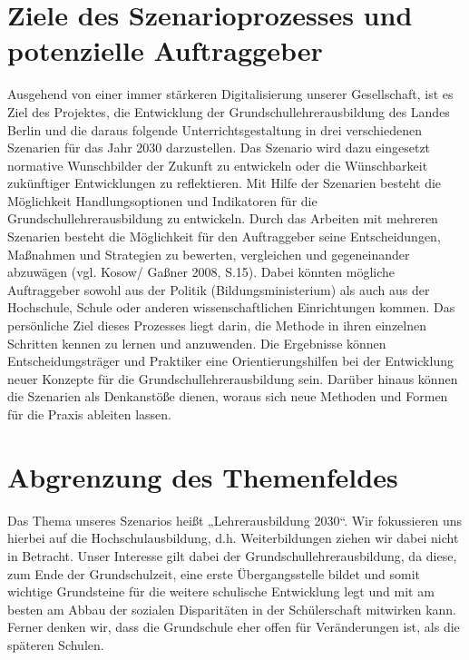 \documentclass[12pt,a4paper]{article}
\begin{document}
\section{Ziele des Szenarioprozesses und potenzielle Auftraggeber}
Ausgehend von einer immer stärkeren Digitalisierung unserer Gesellschaft, ist es Ziel des Projektes, die Entwicklung der Grundschullehrerausbildung des Landes Berlin und die daraus folgende Unterrichtsgestaltung in drei verschiedenen Szenarien für das Jahr 2030 darzustellen. Das Szenario wird dazu eingesetzt normative Wunschbilder der Zukunft zu entwickeln oder die Wünschbarkeit zukünftiger Entwicklungen zu reflektieren. Mit Hilfe der Szenarien besteht die Möglichkeit Handlungsoptionen und Indikatoren für die Grundschullehrerausbildung zu entwickeln. Durch das Arbeiten mit mehreren Szenarien besteht die Möglichkeit für den Auftraggeber seine Entscheidungen, Maßnahmen und Strategien zu bewerten, vergleichen und gegeneinander abzuwägen (vgl. Kosow/ Gaßner 2008, S.15)\cite{Kosow2008}. Dabei könnten mögliche Auftraggeber sowohl aus der Politik (Bildungsministerium) als auch aus der Hochschule, Schule oder anderen wissenschaftlichen Einrichtungen kommen.
Das persönliche Ziel dieses Prozesses liegt darin, die Methode in ihren einzelnen Schritten kennen zu lernen und anzuwenden.
Die Ergebnisse können Entscheidungsträger und Praktiker eine Orientierungshilfen bei der Entwicklung neuer Konzepte für die Grundschullehrerausbildung sein. Darüber hinaus können die Szenarien als Denkanstöße dienen, woraus sich neue Methoden und Formen für die Praxis ableiten lassen.

\section{Abgrenzung des Themenfeldes}
Das Thema unseres Szenarios heißt „Lehrerausbildung 2030“. Wir fokussieren uns hierbei auf die Hochschulausbildung, d.h. Weiterbildungen ziehen wir dabei nicht in Betracht. Unser Interesse gilt dabei der Grundschullehrerausbildung, da diese, zum Ende der Grundschulzeit, eine erste Übergangsstelle bildet und somit wichtige Grundsteine für die weitere schulische Entwicklung legt und mit am besten am Abbau der sozialen Disparitäten in der Schülerschaft mitwirken kann. Ferner denken wir, dass die Grundschule eher offen für Veränderungen ist, als die späteren Schulen.
\end{document}
